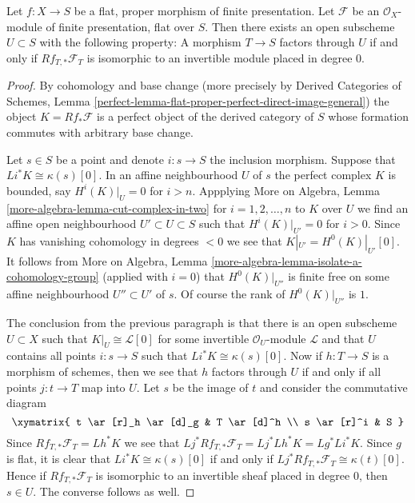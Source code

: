 \begin{lemma}
\label{lemma-open}
Let $f : X \to S$ be a flat, proper morphism of finite presentation.
Let $\mathcal{F}$ be an $\mathcal{O}_X$-module of finite presentation,
flat over $S$. Then there exists an open subscheme
$U \subset S$ with the following property:
A morphism $T \to S$ factors through $U$ if and only if
$Rf_{T, *}\mathcal{F}_T$ is isomorphic to an invertible module
placed in degree $0$.
\end{lemma}

\begin{proof}
By cohomology and base change (more precisely by
Derived Categories of Schemes, Lemma
\ref{perfect-lemma-flat-proper-perfect-direct-image-general})
the object $K = Rf_*\mathcal{F}$ is a perfect object of the derived
category of $S$ whose formation commutes with arbitrary base change.

\medskip\noindent
Let $s \in S$ be a point and denote $i : s \to S$ the inclusion morphism.
Suppose that $Li^*K \cong \kappa(s)[0]$.
In an affine neighbourhood $U$ of $s$ the perfect complex
$K$ is bounded, say $H^i(K)|_U = 0$ for $i > n$. Appplying
More on Algebra, Lemma \ref{more-algebra-lemma-cut-complex-in-two}
for $i = 1, 2, \ldots, n$ to $K$ over $U$ we find
an affine open neighbourhood $U' \subset U \subset S$ such that
$H^i(K)|_{U'} = 0$ for $i > 0$. Since $K$ has vanishing cohomology
in degrees $<0$ we see that $K|_{U'} = H^0(K)|_{U'}[0]$.
It follows from
More on Algebra, Lemma \ref{more-algebra-lemma-isolate-a-cohomology-group}
(applied with $i = 0$) that $H^0(K)|_{U''}$ is finite free
on some affine neighbourhood $U'' \subset U'$ of $s$.
Of course the rank of $H^0(K)|_{U''}$ is $1$.

\medskip\noindent
The conclusion from the previous paragraph is that there is an open subscheme
$U \subset X$ such that $K|_U \cong \mathcal{L}[0]$ for some invertible
$\mathcal{O}_U$-module $\mathcal{L}$ and that $U$ contains all
points $i : s \to S$ such that $Li^*K \cong \kappa(s)[0]$. Now if
$h : T \to S$ is a morphism of schemes, then we see that $h$ factors
through $U$ if and only if all points $j : t \to T$ map into $U$.
Let $s$ be the image of $t$ and consider the commutative diagram
$$
\xymatrix{
t \ar[r]_h \ar[d]_g & T \ar[d]^h \\
s \ar[r]^i & S
}
$$
Since $Rf_{T, *}\mathcal{F}_T = Lh^*K$ we see that
$Lj^*Rf_{T, *}\mathcal{F}_T = Lj^*Lh^*K = Lg^*Li^*K$.
Since $g$ is flat, it is clear that $Li^*K \cong \kappa(s)[0]$
if and only if $Lj^*Rf_{T, *}\mathcal{F}_T \cong \kappa(t)[0]$.
Hence if $Rf_{T, *}\mathcal{F}_T$ is isomorphic to an invertible
sheaf placed in degree $0$, then $s \in U$. The converse follows
as well.
\end{proof}

